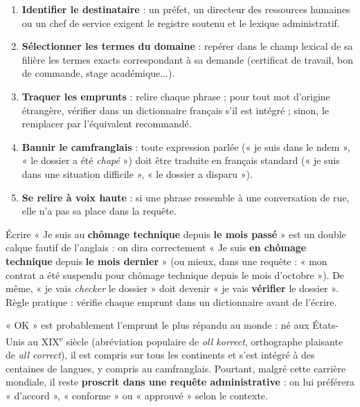 \documentclass[11pt]{article}
\begin{document}
\begin{methode}
\begin{enumerate}
\item \textbf{Identifier le destinataire} : un préfet, un directeur des ressources humaines ou un chef de service exigent le registre soutenu et le lexique administratif.
\item \textbf{Sélectionner les termes du domaine} : repérer dans le champ lexical de sa filière les termes exacts correspondant à sa demande (certificat de travail, bon de commande, stage académique...).
\item \textbf{Traquer les emprunts} : relire chaque phrase ; pour tout mot d'origine étrangère, vérifier dans un dictionnaire français s'il est intégré ; sinon, le remplacer par l'équivalent recommandé.
\item \textbf{Bannir le camfranglais} : toute expression parlée (« je suis dans le ndem », « le dossier a été \emph{chapé} ») doit être traduite en français standard (« je suis dans une situation difficile », « le dossier a disparu »).
\item \textbf{Se relire à voix haute} : si une phrase ressemble à une conversation de rue, elle n'a pas sa place dans la requête.
\end{enumerate}
\end{methode}

\begin{attention}
Écrire « Je suis au \textbf{chômage technique} depuis \textbf{le mois passé} » est un double calque fautif de l'anglais : on dira correctement « Je suis \textbf{en chômage technique} depuis \textbf{le mois dernier} » (ou mieux, dans une requête : « mon contrat a été suspendu pour chômage technique depuis le mois d'octobre »). De même, « je vais \emph{checker} le dossier » doit devenir « je vais \textbf{vérifier} le dossier ». Règle pratique : vérifie chaque emprunt dans un dictionnaire avant de l'écrire.
\end{attention}

\begin{savaistu}[Le mot « ok »]
« OK » est probablement l'emprunt le plus répandu au monde : né aux États-Unis au XIX\textsuperscript{e} siècle (abréviation populaire de \emph{oll korrect}, orthographe plaisante de \emph{all correct}), il est compris sur tous les continents et s'est intégré à des centaines de langues, y compris au camfranglais. Pourtant, malgré cette carrière mondiale, il reste \textbf{proscrit dans une requête administrative} : on lui préférera « d'accord », « conforme » ou « approuvé » selon le contexte.
\end{savaistu}
\end{document}

